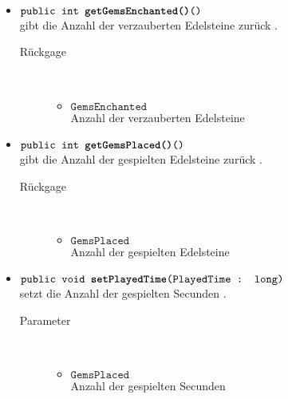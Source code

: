 \begin{description}
\begin{itemize}
					\item $\texttt{public  int \textbf{getGemsEnchanted()}()}$ \\ gibt die Anzahl der verzauberten Edelsteine zurück .
				\begin{description}
				\item[Rückgage] \hfill \\
					\vspace{-.8cm}
					\begin{itemize}
						\item $\texttt{GemsEnchanted }$ \\Anzahl der verzauberten Edelsteine
					\end{itemize}	
					\end{description}
					\item $\texttt{public  int \textbf{getGemsPlaced()}()}$ \\ gibt die Anzahl der gespielten Edelsteine zurück .
				\begin{description}
				\item[Rückgage] \hfill \\
					\vspace{-.8cm}
					\begin{itemize}
						\item $\texttt{GemsPlaced }$ \\Anzahl der gespielten Edelsteine
					\end{itemize}	
					\end{description}
					\item $\texttt{public  void \textbf{setPlayedTime}(PlayedTime : long)}$ \\ setzt die Anzahl der gespielten  Secunden .
				\begin{description}
				\item[Parameter] \hfill \\
					\vspace{-.8cm}
					\begin{itemize}
						\item $\texttt{GemsPlaced }$ \\Anzahl der gespielten  Secunden
					\end{itemize}	
					\end{description}			
					

\end{itemize}
\end{description}
